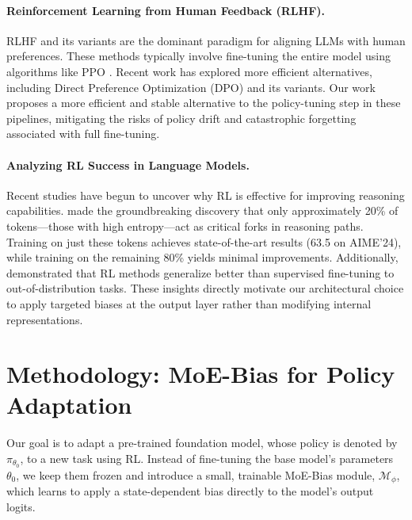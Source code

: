 \documentclass{article}
\begin{document}
\paragraph{Reinforcement Learning from Human Feedback (RLHF).}
RLHF \citep{ouyang2022training} and its variants are the dominant paradigm for aligning LLMs with human preferences. These methods typically involve fine-tuning the entire model using algorithms like PPO \citep{schulman2017proximal}. Recent work has explored more efficient alternatives, including Direct Preference Optimization (DPO) \citep{rafailov2023direct} and its variants. Our work proposes a more efficient and stable alternative to the policy-tuning step in these pipelines, mitigating the risks of policy drift and catastrophic forgetting associated with full fine-tuning.

\paragraph{Analyzing RL Success in Language Models.}
Recent studies have begun to uncover why RL is effective for improving reasoning capabilities. \citet{wang2025highentropy} made the groundbreaking discovery that only approximately 20\% of tokens—those with high entropy—act as critical forks in reasoning paths. Training on just these tokens achieves state-of-the-art results (63.5 on AIME'24), while training on the remaining 80\% yields minimal improvements. Additionally, \citet{chu2025sft} demonstrated that RL methods generalize better than supervised fine-tuning to out-of-distribution tasks. These insights directly motivate our architectural choice to apply targeted biases at the output layer rather than modifying internal representations.


\section{Methodology: MoE-Bias for Policy Adaptation}

Our goal is to adapt a pre-trained foundation model, whose policy is denoted by $\pi_{\theta_0}$, to a new task using RL. Instead of fine-tuning the base model's parameters $\theta_0$, we keep them frozen and introduce a small, trainable MoE-Bias module, $\mathcal{M}_{\phi}$, which learns to apply a state-dependent bias directly to the model's output logits.
\end{document}
